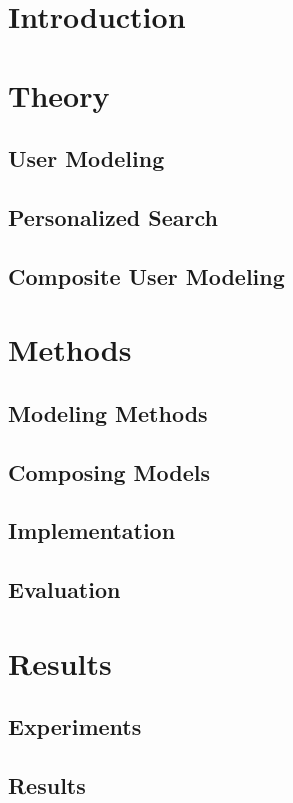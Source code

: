 \documentclass[
  10pt,
  b5paper,
  oneside
]{thesis}
\begin{document}
  
  \frontmatter
    
    
  \mainmatter
    
    \chapter{Introduction}

    \chapter{Theory}
      \section{User Modeling}
      \section{Personalized Search}
      \section{Composite User Modeling}
 
    \chapter{Methods}
      \section{Modeling Methods}
      \section{Composing Models}      
      \section{Implementation}      
      \section{Evaluation}      

    \chapter{Results}
      \section{Experiments}      
      \section{Results}      
\end{document}
